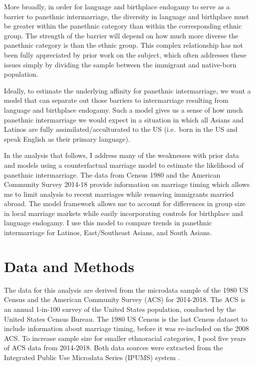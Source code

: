 \documentclass[11pt,]{article}
\begin{document}
More broadly, in order for language and birthplace endogamy to serve as a barrier to panethnic intermarriage, the diversity in language and birthplace must be greater within the panethnic category than within the corresponding ethnic group. The strength of the barrier will depend on how much more diverse the panethnic category is than the ethnic group. This complex relationship has not been fully appreciated by prior work on the subject, which often addresses these issues simply by dividing the sample between the immigrant and native-born population.

Ideally, to estimate the underlying affinity for panethnic intermarriage, we want a model that can separate out those barriers to intermarriage resulting from language and birthplace endogamy. Such a model gives us a sense of how much panethnic intermarriage we would expect in a situation in which all Asians and Latinos are fully assimilated/acculturated to the US (i.e.~born in the US and speak English as their primary language).

In the analysis that follows, I address many of the weaknesses with prior data and models using a counterfactual marriage model to estimate the likelihood of panethnic intermarriage. The data from Census 1980 and the American Community Survey 2014-18 provide information on marriage timing which allows me to limit analysis to recent marriages while removing immigrants married abroad. The model framework allows me to account for differences in group size in local marriage markets while easily incorporating controls for birthplace and language endogamy. I use this model to compare trends in panethnic intermarriage for Latinos, East/Southeast Asians, and South Asians.

\hypertarget{data-and-methods}{%
\section{Data and Methods}\label{data-and-methods}}

The data for this analysis are derived from the microdata sample of the 1980 US Census and the American Community Survey (ACS) for 2014-2018. The ACS is an annual 1-in-100 survey of the United States population, conducted by the United States Census Bureau. The 1980 US Census is the last Census dataset to include information about marriage timing, before it was re-included on the 2008 ACS. To increase sample size for smaller ethnoracial categories, I pool five years of ACS data from 2014-2018. Both data sources were extracted from the Integrated Public Use Microdata Series (IPUMS) system \citep{ruggles_ipums_2020}.
\end{document}
